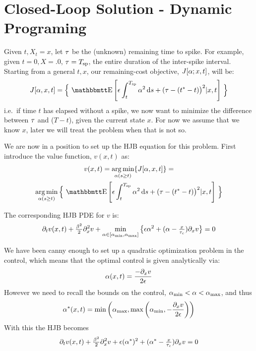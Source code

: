 \documentclass{article}
\begin{document}
\section{Closed-Loop Solution - Dynamic Programing}
Given $t, X_t = x$, let ${\tau}$ be the (unknown) remaining time to spike. For
example, given $t=0, X=.0$, ${\tau} = { T_{\textrm{sp} } }$, the entire duration of the inter-spike interval.
Starting from a general $t, x$, our remaining-cost objective, $J[{\alpha}; x,t]$,
will be:
\begin{equation}
J[\a, x,t]  = \Big\{ \,
\Exp\left[
\e \int_t^\ts  \a^2 \intd{s}
+
(\t - (\T-t) \big)^2 |x,t
\right] \, \Big\}
\label{eq:OC_LS_mean_objective}   
\end{equation}
i.e.\ if time $t$ has elapsed without a spike, we now want to minimize
the difference between ${\tau}$ and ($T-t$), given the current state $x$. For now we
assume that we know $x$, later we will treat the problem when that is not so. 

We are now in a position to set up the HJB equation for this problem. First
introduce the value function, $v(x,t)$ as:
\begin{multline}
v(x,t) = \argmin_{\a(s \geq t)} \{J[\a, x,t] \} =
\\ 
\argmin_{\a(s \geq t)} 
\Big\{ \,
\Exp\left[
\e \int_t^\ts  \a^2 \intd{s}
+
(\t - (\T-t) \big)^2 |x,t
\right] \, \Big\}
\label{eq:OC_LS_mean_value}   
\end{multline}

The corresponding HJB PDE for $v$ is:
\begin{equation}
{\partial}_t v(x,t) + \tfrac{{\beta}^2}{2} {\partial}_x^2 v + \min_{{\alpha} \in [{ {\alpha}_{\textrm{min}} }, { {\alpha}_{\textrm{max}} }]}\big\{
{\epsilon} {\alpha}^2 + ({\alpha}-\tfrac{x}{{ \tau_{c} }}) {\partial}_x v \big\} = 0
\label{eq:OC_LS_mean_HJB}
\end{equation}

We have been canny enough to set up a quadratic optimization problem in the
control, which means that the optimal control is given analytically via:
\begin{equation}
{\alpha}(x,t) = \frac{-{\partial}_x v}{2{\epsilon}} 
\label{eq:OC_LS_variance_energy_quadratic_control}
\end{equation}
However we need to recall the bounds on the control, ${ {\alpha}_{\textrm{min}} } < {\alpha} < { {\alpha}_{\textrm{max}} }$, and
thus
\begin{equation}
{ {\alpha}^* }(x,t) = \min \left({ {\alpha}_{\textrm{max}} }, \max\left({ {\alpha}_{\textrm{min}} }, -\frac{{\partial}_x v}{2{\epsilon}}\right)
\right)
\label{eq:OC_LS_variance_energy_quadratic_control_bounds}
\end{equation}
With this the HJB becomes
\begin{equation}
{\partial}_t v(x,t) + \tfrac{{\beta}^2}{2} {\partial}_x^2 v + 
{\epsilon} ({ {\alpha}^* })^2 + ({ {\alpha}^* }-\tfrac{x}{{ \tau_{c} }}) {\partial}_x v 
= 0
\label{eq:OC_LS_mean_HJB_bounded_control}
\end{equation}
\end{document}
